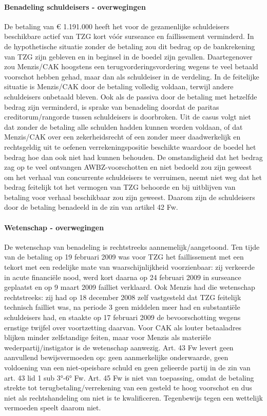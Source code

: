 \documentclass[
  dutch,
  a4paper,
]{article}
\begin{document}
\paragraph{Benadeling schuldeisers - overwegingen}\label{benadeling-schuldeisers---overwegingen-85}

De betaling van € 1.191.000 heeft het voor de gezamenlijke schuldeisers beschikbare actief van TZG kort vóór surseance en faillissement verminderd. In de hypothetische situatie zonder de betaling zou dit bedrag op de bankrekening van TZG zijn gebleven en in beginsel in de boedel zijn gevallen. Daartegenover zou Menzis/CAK hoogstens een terugvorderingsvordering wegens te veel betaald voorschot hebben gehad, maar dan als schuldeiser in de verdeling. In de feitelijke situatie is Menzis/CAK door de betaling volledig voldaan, terwijl andere schuldeisers onbetaald bleven. Ook als de passiva door de betaling met hetzelfde bedrag zijn verminderd, is sprake van benadeling doordat de paritas creditorum/rangorde tussen schuldeisers is doorbroken. Uit de casus volgt niet dat zonder de betaling alle schulden hadden kunnen worden voldaan, of dat Menzis/CAK over een zekerheidsrecht of een zonder meer daadwerkelijk en rechtsgeldig uit te oefenen verrekeningspositie beschikte waardoor de boedel het bedrag hoe dan ook niet had kunnen behouden. De omstandigheid dat het bedrag zag op te veel ontvangen AWBZ-voorschotten en niet bedoeld zou zijn geweest om het verhaal van concurrente schuldeisers te verruimen, neemt niet weg dat het bedrag feitelijk tot het vermogen van TZG behoorde en bij uitblijven van betaling voor verhaal beschikbaar zou zijn geweest. Daarom zijn de schuldeisers door de betaling benadeeld in de zin van artikel 42 Fw.

\paragraph{Wetenschap - overwegingen}\label{wetenschap---overwegingen-85}

De wetenschap van benadeling is rechtstreeks aannemelijk/aangetoond. Ten tijde van de betaling op 19 februari 2009 was voor TZG het faillissement met een tekort met een redelijke mate van waarschijnlijkheid voorzienbaar: zij verkeerde in acute financiële nood, werd kort daarna op 24 februari 2009 in surseance geplaatst en op 9 maart 2009 failliet verklaard. Ook Menzis had die wetenschap rechtstreeks: zij had op 18 december 2008 zelf vastgesteld dat TZG feitelijk technisch failliet was, na periode 3 geen middelen meer had en substantiële schuldeisers had, en staakte op 17 februari 2009 de bevoorschotting wegens ernstige twijfel over voortzetting daarvan. Voor CAK als louter betaaladres blijken minder zelfstandige feiten, maar voor Menzis als materiële wederpartij/instigator is de wetenschap aanwezig. Art. 43 Fw levert geen aanvullend bewijsvermoeden op: geen aanmerkelijke onderwaarde, geen voldoening van een niet-opeisbare schuld en geen gelieerde partij in de zin van art. 43 lid 1 sub 3°-6° Fw. Art. 45 Fw is niet van toepassing, omdat de betaling strekte tot terugbetaling/verrekening van een gesteld te hoog voorschot en dus niet als rechtshandeling om niet is te kwalificeren. Tegenbewijs tegen een wettelijk vermoeden speelt daarom niet.
\end{document}
